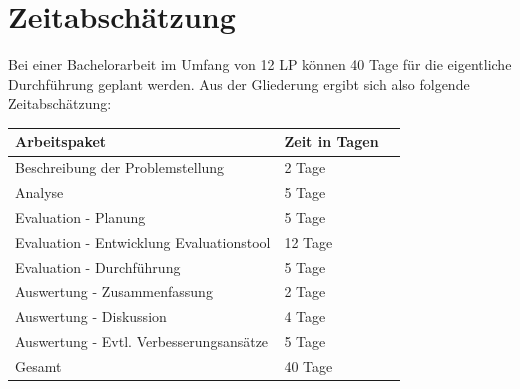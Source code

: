 \section{Zeitabschätzung}
Bei einer Bachelorarbeit im Umfang von 12 LP können 40 Tage für die eigentliche Durchführung geplant werden. Aus der Gliederung ergibt sich also folgende Zeitabschätzung:
\begin{table}[h]
    \centering
    \begin{tabular}{|l|l|l|}
    	\hline
        Arbeitspaket & Zeit in Tagen \\
        \hline
        Beschreibung der Problemstellung & 2 Tage \\
        Analyse & 5 Tage \\
        Evaluation - Planung & 5 Tage \\
        Evaluation - Entwicklung Evaluationstool & 12 Tage \\
        Evaluation - Durchführung & 5 Tage \\
        Auswertung - Zusammenfassung & 2 Tage \\
        Auswertung - Diskussion & 4 Tage \\
        Auswertung - Evtl. Verbesserungsansätze & 5 Tage \\
        \hline
        Gesamt & 40 Tage \\
        \hline
        
    \end{tabular}
\end{table}


